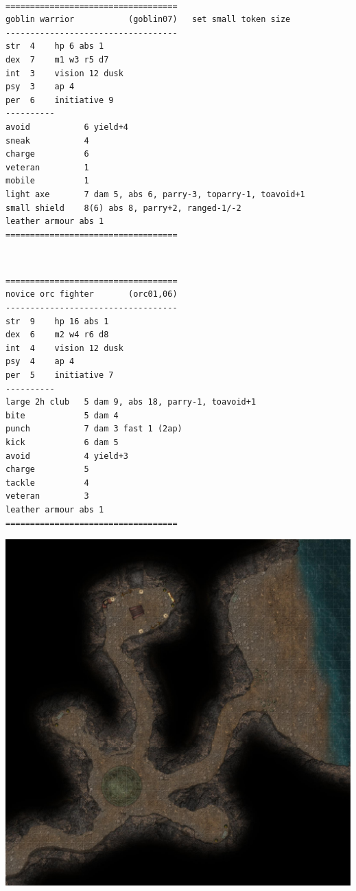 \

\goodbreak \begin{samepage} \small \begin{verbatim}
===================================
goblin warrior           (goblin07)   set small token size
-----------------------------------
str  4    hp 6 abs 1
dex  7    m1 w3 r5 d7
int  3    vision 12 dusk
psy  3    ap 4
per  6    initiative 9
----------
avoid           6 yield+4
sneak           4
charge          6
veteran         1
mobile          1
light axe       7 dam 5, abs 6, parry-3, toparry-1, toavoid+1
small shield    8(6) abs 8, parry+2, ranged-1/-2
leather armour abs 1
===================================
\end{verbatim} \normalsize \end{samepage}

\

\goodbreak \begin{samepage} \small \begin{verbatim}
===================================
novice orc fighter       (orc01,06)
-----------------------------------
str  9    hp 16 abs 1
dex  6    m2 w4 r6 d8
int  4    vision 12 dusk
psy  4    ap 4
per  5    initiative 7
----------
large 2h club   5 dam 9, abs 18, parry-1, toavoid+1
bite           	5 dam 4
punch          	7 dam 3 fast 1 (2ap)
kick            6 dam 5
avoid          	4 yield+3
charge         	5
tackle         	4
veteran        	3
leather armour abs 1
===================================
\end{verbatim} \normalsize \end{samepage}






\clearpage
\thispagestyle{empty}

\null

\vfill

\noindent
\includegraphics[width=0.999\textwidth]{./map/cave.jpg}

\vfill








